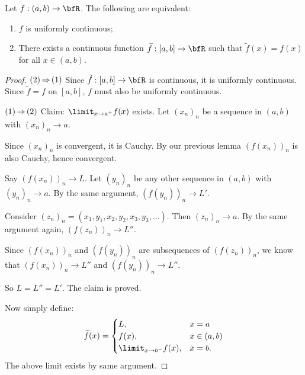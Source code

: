     \begin{theorem}
        Let $f:(a,b) \rightarrow \bfR$. The following are equivalent:
            \begin{enumerate}[label = (\arabic*)]
                \item $f$ is uniformly continuous;
                \item There exists a continuous function $\widetilde{f}:[a,b] \rightarrow \bfR$ such that $\widetilde{f}(x) = f(x)$ for all $x \in (a,b)$.
            \end{enumerate}
    \end{theorem}
        \begin{proof}
            $(2) \hspace{-1pt}\Rightarrow\hspace{-1pt} (1)$ Since $\tilde{f}:[a,b] \rightarrow \bfR$ is continuous, it is uniformly continuous. Since $\tilde{f} = f$ on $[a,b]$, $f$ must also be uniformly continuous. \nl
            
            $(1) \hspace{-1pt}\Rightarrow\hspace{-1pt} (2)$ Claim: $\limit_{x \rightarrow a^+}f(x)$ exists. Let $(x_n)_n$ be a sequence in $(a,b)$ with $(x_n)_n \rightarrow a$. \nl
            
            Since $(x_n)_n$ is convergent, it is Cauchy. By our previous lemma $(f(x_n))_n$ is also Cauchy, hence convergent. \nl
            
            Say $(f(x_n))_n \rightarrow L$. Let $(y_n)_n$ be any other sequence in $(a,b)$ with $(y_n)_n \rightarrow a$. By the same argument, $(f(y_n))_n \rightarrow L'$. \nl
            
            Consider $(z_n)_n = (x_1,y_1,x_2,y_2,x_3,y_3,...)$. Then $(z_n)_n \rightarrow a$. By the same argument again, $(f(z_n))_n \rightarrow L''$. \nl
            
            Since $(f(x_n))_n$ and $(f(y_n))_n$ are subsequences of $(f(z_n))_n$, we know that $(f(x_n))_n \rightarrow L''$ and $(f(y_n))_n \rightarrow L''$. \nl
            
            So $L = L'' = L'$. The claim is proved. \nl
            
            Now simply define:
                \begin{equation*}
                \begin{split}
                    \widetilde{f}(x) = 
                    \begin{cases}
                        L, & x = a\\
                        f(x), & x \in (a,b) \\
                        \limit_{x \rightarrow b^-}f(x), & x = b.
                    \end{cases}
                \end{split}
                \end{equation*}
            The above limit exists by same argument.
        \end{proof}

